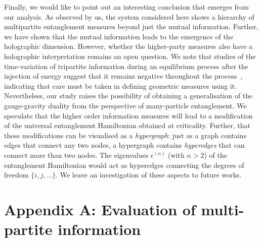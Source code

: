 Finally, we would like to point out an interesting conclusion that emerges from our analysis. As observed by us, the system considered here shows a hierarchy of multipartite entanglement measures beyond just the mutual information.
Further, we have shown that the mutual information leads to the emergence of the holographic dimension. However, whether the higher-party measures also have a holographic interpretation remains an open question.
We note that studies of the time-variation of tripartite information during an equilibrium process after the injection of energy suggest that it remains negative throughout the process~\cite{balasubramanian2011,asadi2018,aliakbari_2019}, indicating that care must be taken in defining geometric measures using it. Nevertheless, our study raises the possibility of obtaining a generalisation of the gauge-gravity duality from the perspective of many-particle entanglement. We speculate that the higher order information measures will lead to a modification of the universal entanglement Hamiltonian obtained at criticality. Further, that these modifications can be visualised as a {\it hypergraph}: just as a graph contains edges that connect any two nodes, a hypergraph contains {\it hyperedges} that can connect more than two nodes. The eigenvalues \(\epsilon^{(n)}\) (with \(n>2\)) of the entanglement Hamiltonian would act as hyperedges connecting the degrees of freedom \(\{i,j,\ldots\}\). We leave an investigation of these aspects to future works.

\section*{Appendix A: Evaluation of multi-partite information}\label{g-partite info}

